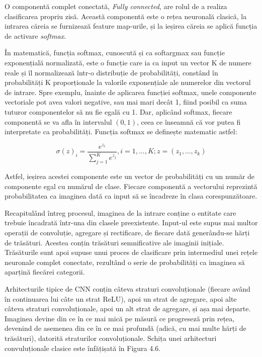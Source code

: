 \documentclass[a4paper,12pt]{report}
\begin{document}
O componentă complet conectată, \emph{Fully connected}, are rolul de a realiza
clasificarea propriu zisă. Această componentă este o rețea neuronală clasică, la intrarea
căreia se furnizează feature map-urile, și la ieșirea căreia se aplică funcția de activare
\emph{softmax}. 

În matematică, funcția softmax, cunoscută și ca softargmax sau funcție exponențială 
normalizată, este o funcție care ia ca input un vector K de numere reale și îl normalizează 
într-o distribuție de probabilități, constând în probabilități K proporționale la valorile 
exponențiale ale numerelor din vectorul de intrare. Spre exemplu, înainte de 
aplicarea funcției softmax, unele componente vectoriale pot avea valori negative, sau mai mari
decât 1, fiind posibil ca suma tuturor componentelor să nu fie egală cu 1. Dar, 
aplicând softmax, fiecare componentă se va afla în intervalul $(0,1)$, ceea ce 
înseamnă că vor putea fi interpretate ca probabilități. Funcția softmax se definește
matematic astfel:

\begin{equation*}
    \sigma(z)_i = \frac{e^{z_i}}{\sum_{j=1}^{K}e^{z_j}}, i=1,...,K; z=(z_1,...,z_k)
 \end{equation*}
 

Astfel, ieșirea acestei componente este un vector de probabilități cu un număr de
componente egal cu numărul de clase. Fiecare componentă a vectorului reprezintă
probabilitatea ca imaginea dată ca input să se încadreze în clasa corespunzătoare.

Recapitulând întreg procesul, imaginea de la intrare conține o entitate care 
trebuie încadrată într-una din clasele preexistente. Input-ul este supus mai multor
operații de convoluție, agregare și rectificare, de fiecare dată generându-se
hărți de trăsături. Acestea conțin trăsături semnificative ale imaginii
inițiale. Trăsăturile sunt apoi supuse unui proces de clasificare prin intermediul
unei rețele neuronale complet conectate, rezultând o serie de
probabilități ca imaginea să aparțină fiecărei categorii. 

Arhitecturile tipice de CNN conțin câteva straturi convoluționale (fiecare având 
în continuarea lui câte un strat ReLU), apoi un strat de agregare, apoi alte câteva straturi
convoluționale, apoi un alt strat de agregare, și așa mai departe. Imaginea 
devine din ce în ce mai mică pe măsură ce progreseză prin rețea, devenind de asemenea 
din ce în ce mai profundă (adică, cu mai multe hărți de trăsături), datorită 
straturilor convoluționale. Schița unei arhitecturi convuluționale clasice este 
înfățișată în Figura 4.6.
\end{document}
